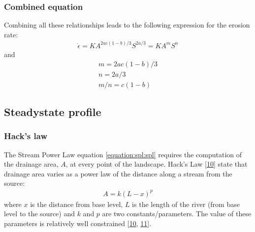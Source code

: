 \documentclass[letterpaper,10pt,english]{jupyterBook}
\begin{document}
\subsubsection{Combined equation}
\label{\detokenize{spl-details:combined-equation}}
\sphinxAtStartPar
Combining all these relationships leads to the following expression for the erosion rate:
\begin{equation}\label{equation:spl-details:spl-eps}
\begin{split}\dot\epsilon=KA^{2ac(1-b)/3}S^{2a/3}=KA^mS^n\end{split}
\end{equation}
\sphinxAtStartPar
and
\begin{equation*}
\begin{split}m=2ac(1-b)/3\\
n=2a/3\\
m/n = c(1-b)\end{split}
\end{equation*}
\sphinxstepscope


\subsection{Steady\sphinxhyphen{}state profile}
\label{\detokenize{spl-solution:steady-state-profile}}\label{\detokenize{spl-solution::doc}}

\subsubsection{Hack’s law}
\label{\detokenize{spl-solution:hack-s-law}}
\sphinxAtStartPar
The Stream Power Law \sphinxhyphen{} equation \eqref{equation:spl:spl} \sphinxhyphen{} requires the computation of the drainage area, \(A\), at every point of the landscape. Hack’s Law {[}\hyperlink{cite.references:id22}{10}{]} state that drainage area varies as a power law of the distance along a stream from the source:
\begin{equation*}
\begin{split}A = k(L-x)^p\end{split}
\end{equation*}
\sphinxAtStartPar
where \(x\) is the distance from base level, \(L\) is the length of the river (from base level to the source) and \(k\) and \(p\) are two constants/parameters. The value of these parameters is relatively well constrained {[}\hyperlink{cite.references:id22}{10}, \hyperlink{cite.references:id23}{11}{]}.
\end{document}
